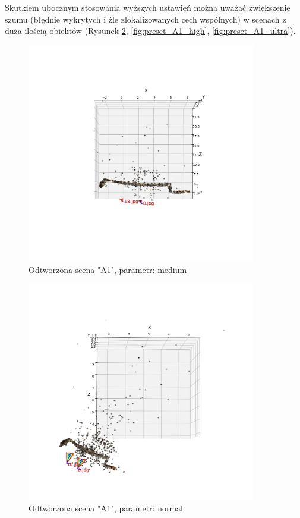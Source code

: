 Skutkiem ubocznym stosowania wyższych ustawień można uważać zwiększenie szumu (błędnie wykrytych i źle zlokalizowanych cech wspólnych) w scenach z duża ilością obiektów (Rysunek \ref{fig:preset_A1_normal}, \ref{fig:preset_A1_high}, \ref{fig:preset_A1_ultra}).

\begin{figure}[h]
   \centering
   \includegraphics[width=10cm]{preset_A1/medium.png}
   \caption{Odtworzona scena "A1", parametr: medium}
   \label {fig:preset_A1_medium}
\end{figure}
\begin{figure}[h]
   \centering
   \includegraphics[width=10cm]{preset_A1/normal.png}
   \caption{Odtworzona scena "A1", parametr: normal}
   \label {fig:preset_A1_normal}
\end{figure}
